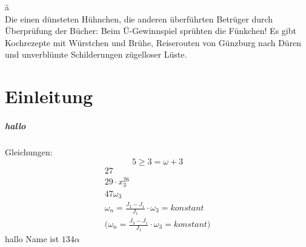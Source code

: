 \documentclass[paper=a4,bibliography=totoc,BCOR=10mm,twoside,numbers=noenddot,fontsize=11pt]{article}
\begin{document}
\"a \\
Die einen dünsteten Hühnchen, die anderen überführten Betrüger durch Überprüfung der Bücher: Beim Ü-Gewinnspiel sprühten die Fünkchen! Es gibt Kochrezepte mit Würstchen und Brühe, Reiserouten von Günzburg nach Düren und unverblümte Schilderungen zügelloser Lüste.


\section{Einleitung}
\subparagraph{hallo}



Gleichungen:
\begin{equation}
5\geq3=\omega+3
\end{equation}
\begin{align}
27\\
29 \cdot x^{26}_3\\
47 \omega_3\\
\omega_n = \frac{J_3 - J_1}{J_1} \cdot \omega_3 = konstant\\
\Biggl( \omega_n = \frac{J_3 - J_1}{J_1} \cdot \omega_3 = konstant \Biggr)
\end{align}
hallo Name ist $134\alpha$
\end{document}
